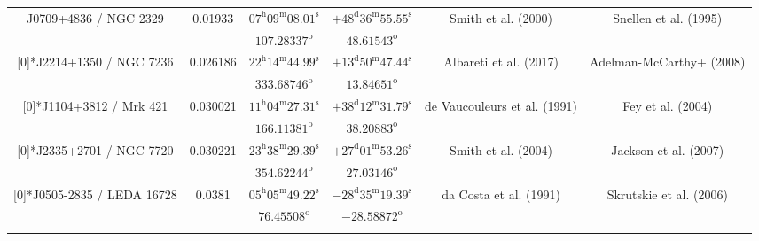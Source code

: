 \begin{landscape}
\begin{longtable}{cccccc}
 \multirow{2}[0]{*}{J0709+4836 / NGC 2329} & \multirow{2}[0]{*}{0.01933} &  
    $07^\text{h}09^\text{m}08.01^\text{s}$  & $+48^\text{d}36^\text{m}55.55^\text{s}$  & 
    \multirow{2}[0]{*}{Smith et al. (2000)\cite{RedRef52_2000}}& \multirow{2}[0]{*}{Snellen et al. (1995) \cite{CoordRef95_1995}} \\*
    & & $107.28337^\text{o}$ & $48.61543^\text{o}$ & & \\ \addlinespace 

  \multirow{2}[0]{*}{J2214+1350 / NGC 7236} & \multirow{2}[0]{*}{0.026186} &  
    $22^\text{h}14^\text{m}44.99^\text{s}$  & $+13^\text{d}50^\text{m}47.44^\text{s}$  & 
     \multirow{2}[0]{*}{Albareti et al. (2017)\cite{RedRef9_2017}}& \multirow{2}[0]{*}{Adelman-McCarthy+ (2008) \cite{CoordRef28_2008}} \\*
     & & $333.68746^\text{o}$ & $13.84651^\text{o}$ & & \\ \addlinespace 

  \multirow{2}[0]{*}{J1104+3812 / Mrk 421} & \multirow{2}[0]{*}{0.030021} &  
    $11^\text{h}04^\text{m}27.31^\text{s}$  & $+38^\text{d}12^\text{m}31.79^\text{s}$  & 
    \multirow{2}[0]{*}{de Vaucouleurs et al. (1991)\cite{RedRef97_1991}}& \multirow{2}[0]{*}{Fey et al. (2004) \cite{CoordRef2_2004}} \\*
    & & $166.11381^\text{o}$ & $38.20883^\text{o}$ & & \\ \addlinespace 

\multirow{2}[0]{*}{J2335+2701 / NGC 7720} & \multirow{2}[0]{*}{0.030221} &  
    $23^\text{h}38^\text{m}29.39^\text{s}$  & $+27^\text{d}01^\text{m}53.26^\text{s}$  & 
    \multirow{2}[0]{*}{Smith et al. (2004)\cite{RedRef98_2004}}& \multirow{2}[0]{*}{Jackson et al. (2007)\cite{CoordRef83_2007}} \\*
    & & $354.62244^\text{o}$ & $27.03146^\text{o}$ & & \\ \addlinespace 

\multirow{2}[0]{*}{J0505-2835 / LEDA 16728} & \multirow{2}[0]{*}{0.0381} &  
    $05^\text{h}05^\text{m}49.22^\text{s}$  & $-28^\text{d}35^\text{m}19.39^\text{s}$  & 
     \multirow{2}[0]{*}{da Costa et al. (1991)\cite{RedRef99_1991}}& \multirow{2}[0]{*}{Skrutskie et al. (2006)\cite{CoordRef77_2006}} \\*
    & & $76.45508^\text{o}$ & $-28.58872^\text{o}$ & & \\ \addlinespace 


\end{longtable}
\end{landscape}
